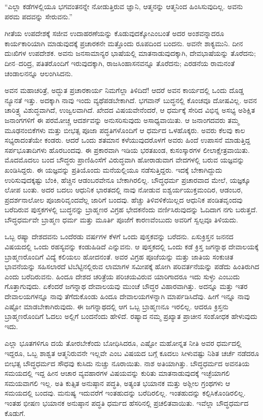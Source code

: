 “ಎಲ್ಲಾ ಕಡೆಗಳಲ್ಲಿಯೂ ಭಗವಂತನನ್ನೇ ನೋಡುತ್ತಿರುವ ಜ್ಞಾನಿ, ಆತ್ಮನನ್ನು ಆತ್ಮನಿಂದ ಹಿಂಸಿಸುವುದಿಲ್ಲ. ಅವನು ಪರಮ ಪದವನ್ನು ಸೇರುವನು.”

ಗೀತೆಯ ಉಪದೇಶಕ್ಕೆ ಸಜೀವ ಉದಾಹರಣೆಯನ್ನು ಕೊಡುವುದಕ್ಕೋ\break ಎಂಬಂತೆ ಅದರ ಅಂಶವನ್ನಾದರೂ ಕಾರ್ಯಕಾರಿಯಾಗಿ ಮಾಡುವುದಕ್ಕೆ ಪ್ರಚಾರಕನೇ ಮತ್ತೊಂದು ರೂಪದಿಂದ ಬಂದನು. ಅವನೇ ಶಾಕ್ಯಮುನಿ. ದೀನ ದುಃಖಿಗಳ ಉಪದೇಶಕ. ಅವನು ಜನಸಾಮಾನ್ಯರ ಭಾಷೆಯಲ್ಲಿ ಮಾತನಾಡುವುದಕ್ಕಾಗಿ, ದೇವಭಾಷೆಯನ್ನು ತೊರೆದನು; ದೀನ–ದರಿದ್ರ, ಪತಿತರೊಂದಿಗೆ ಇರುವುದಕ್ಕಾಗಿ, ರಾಜಸಿಂಹಾಸನವನ್ನೂ ತೊರೆದನು; ಎರಡನೆಯ ರಾಮನಂತೆ ಚಂಡಾಲನನ್ನೂ ಆಲಂಗಿಸಿದನು. 

ಅವನ ಮಹಾಚರಿತ್ರೆ, ಅದ್ಭುತ ಪ್ರಚಾರಕಾರ್ಯ ನಿಮಗೆಲ್ಲಾ ತಿಳಿದಿದೆ! ಆದರೆ ಅವನ ಕಾರ್ಯದಲ್ಲಿ ಒಂದು ದೊಡ್ಡ ನ್ಯೂನತೆ ಇತ್ತು. ಅದಕ್ಕಾಗಿ ನಾವು ಇಂದು ವ್ಯಥೆಪಡಬೇಕಾಗಿದೆ. ಭಗವಾನ್​ ಬುದ್ಧನಲ್ಲಿ ಕೊಂಚವೂ ದೋಷವಿಲ್ಲ. ಅವನ ಚಾರಿತ್ರ್ಯ ವಿಶುದ್ಧವಾಗಿದೆ, ಉಜ್ವಲವಾಗಿದೆ. ಖೇದದ ವಿಷಯವೇನೆಂದರೆ, ಆ ಧರ್ಮಕ್ಕೆ ಸೇರಿದ ವಿಭಿನ್ನ ಅಸಭ್ಯ ಅಶಿಕ್ಷಿತ ಜನಾಂಗಗಳಿಗೆ ಈ ಪರಮೋಚ್ಚ ಆದರ್ಶವನ್ನು ಅನುಸರಿಸುವುದು ಅಸಾಧ್ಯವಾಯಿತು. ಆ ಜನಾಂಗದವರು ತಮ್ಮ ಮೂಢನಂಬಿಕೆಗಳು ಮತ್ತು ಬೀಭತ್ಸ ಪೂಜಾ ಪದ್ಧತಿಗಳೊಂದಿಗೆ ಆ ಧರ್ಮದ ಒಳಹೊಕ್ಕರು. ಅವರು ಕೆಲವು ಕಾಲ ಸಭ್ಯರಾದಂತೆಯೇ ಕಂಡರು. ಆದರೆ ಒಂದು ಶತಮಾನ ಕಳೆಯುವುದರೊಳಗೆ ಅವರು ಹಿಂದೆ ಉಪಾಸನೆ ಮಾಡುತ್ತಿದ್ದ ಸರ್ಪಭೂತಾದಿಗಳು ಹೊರಬಂದವು. ಈ ಪ್ರಕಾರವಾಗಿ ಇಡಿಯ ಭರತಖಂಡ, ಕುಸಂಸ್ಕಾರಗಳ ಲೀಲಾಕ್ಷೇತ್ರವಾಯಿತು. ಮೊದಮೊದಲು ಬಂದ ಬೌದ್ಧರು ಪ್ರಾಣಿಹಿಂಸೆಗೆ ವಿರುದ್ಧವಾಗಿ ಹೋರಾಡುವಾಗ ವೇದಗಳಲ್ಲಿ ಬರುವ ಯಜ್ಞವನ್ನು ಖಂಡಿಸಿದ್ದರು. ಈ ಯಜ್ಞವನ್ನು ಪ್ರತಿಯೊಂದು ಮನೆಯಲ್ಲಿಯೂ ನಡೆಸುತ್ತಿದ್ದರು. ಇದಕ್ಕೆ ಬೇಕಾಗಿದ್ದುದು ಉರಿಸುವುದಕ್ಕಷ್ಟು ಬೆಂಕಿ, ಹೆಚ್ಚಿನ ಆಡಂಬರವೇನೂ ಬೇಕಾಗಿರಲಿಲ್ಲ. ಬೌದ್ಧಧರ್ಮ ಪ್ರಚಾರವಾದ ಮೇಲೆ, ಯಜ್ಞಕ್ಕೂ ಲೋಪ ಬಂತು. ಅದರ ಬದಲು ಆಧುನಿಕ ಭಾರತದಲ್ಲಿ ನಾವು ನೋಡುವ ಐಶ್ವರ್ಯಯುಕ್ತಮಂದಿರ, ಆಡಂಬರ, ಪ್ರದರ್ಶನಾಲೋಲ ಪೂಜಾರಿವೃಂದವೆಲ್ಲ ಜಾರಿಗೆ ಬಂದವು. ಹೆಚ್ಚು ತಿಳಿವಳಿಕೆಯಿಲ್ಲದ ಆಧುನಿಕ ಪಂಡಿತವೃಂದವು ಬರೆದಿರುವ ಪುಸ್ತಕಗಳಲ್ಲಿ ಬುದ್ಧನನ್ನು ಬ್ರಾಹ್ಮಣರ ವಿಗ್ರಹ ಭೇದಕನೆಂದು ವರ್ಣಿಸಿರುವುದನ್ನು ಓದಿದಾಗ ನಗು ಬರುತ್ತದೆ. ಬೌದ್ಧಧರ್ಮವೇ ಬ್ರಾಹ್ಮಣ ಧರ್ಮ ಮತ್ತು ಮೂರ್ತಿ ಪೂಜೆಗೆ ಕಾರಣವೆಂಬುದು ಅವರಿಗೆ ಸ್ವಲ್ಪವೂ ತಿಳಿಯದು. 

ಒಬ್ಬ ರಷ್ಯಾ ದೇಶದವನು ಒಂದೆರಡು ವರ್ಷಗಳ ಕೆಳಗೆ ಒಂದು ಪುಸ್ತಕವನ್ನು ಬರೆದನು. ಏಸುಕ್ರಿಸ್ತನ ಜನನದ ವಿಷಯದಲ್ಲಿ ಒಂದು ರಹಸ್ಯವನ್ನು ಕಂಡುಹಿಡಿದೆ ಎನ್ನುವನು. ಆ ಪುಸ್ತಕದಲ್ಲಿ ಒಂದು ಕಡೆ ಕ್ರಿಸ್ತ ಜಗನ್ನಾಥ ದೇವಾಲಯಕ್ಕೆ ಬ್ರಾಹ್ಮಣರೊಂದಿಗೆ ವಿದ್ಯೆ ಕಲಿಯಲು ಹೋದನಂತೆ. ಅವರ ವಿಗ್ರಹ ಪೂಜೆಯನ್ನು ಮತ್ತು ಜಾತಿಯ ಸಂಕುಚಿತ ಭಾವನೆಯನ್ನು ಸಹಿಸಲಾರದೆ ಟಿಬೆಟ್ಟಿನಲ್ಲಿರುವ ಲಾಮಾಗಳ ಸಮೀಪಕ್ಕೆ ಹೋಗಿ ಪರಿವರ್ತನೆಯನ್ನು ಪಡೆದು ಹಿಂತಿರುಗಿದ ಎಂದು ಬರೆದಿರುವನು. ಹಿಂದೂ ದೇಶದ ಚರಿತ್ರೆಯ ಪರಿಚಯವಿರುವ ಯಾರಿಗಾದರೂ ಇದು ಸುಳ್ಳು ಎಂಬುದು ಗೊತ್ತಾಗುವುದು. ಏಕೆಂದರೆ ಜಗನ್ನಾಥ ದೇವಾಲಯವು ಮುಂಚೆ ಬೌದ್ಧರ ವಿಹಾರವಾಗಿತ್ತು. ಅದನ್ನೂ ಮತ್ತು ಇತರ ದೇವಾಲಯಗಳನ್ನೂ ನಾವು ತೆಗೆದುಕೊಂಡು ಹಿಂದೂ ದೇವಾಲಯಗಳನ್ನಾಗಿ ಮಾರ್ಪಡಿಸಿದೆವು. ಹೀಗೆ ಇನ್ನೂ ನಾವು ಎಷ್ಟೋ ಮಾಡಬೇಕಾಗಿರುವುದು. ಈ ಜಗನ್ನಾಥದಲ್ಲಿ ಆಗ ಒಬ್ಬ ಬ್ರಾಹ್ಮಣನೂ ಇರಲಿಲ್ಲ. ಆದರೂ ಕ್ರಿಸ್ತನು ಬ್ರಾಹ್ಮಣರೊಂದಿಗೆ ಓದಲು ಅಲ್ಲಿಗೆ ಬಂದನೆಂದು ಹೇಳಿದೆ. ರಷ್ಯಾದ ನಮ್ಮ ಪ್ರಖ್ಯಾತ ಪ್ರಾಚೀನ ಸಂಶೋಧಕ ಹೇಳುವುದು ಇದು. 

ಎಲ್ಲಾ ಭೂತಗಳಿಗೂ ದಯೆ ತೋರಬೇಕೆಂದು ಬೋಧಿಸಿದರೂ, ಎಷ್ಟೋ ಮಹೋನ್ನತ ನೀತಿ ಅವರ ಧರ್ಮದಲ್ಲಿ ಇದ್ದರೂ, ಒಬ್ಬ ಶಾಶ್ವತ ಆತ್ಮನಿರುವನೇ ಇಲ್ಲವೇ ಎಂಬ ವಿಷಯದ ಬಗ್ಗೆ ಕೂದಲು ಸೀಳುವಷ್ಟು ನಿಶಿತ ಚರ್ಚೆ ನಡೆದರೂ ಬೀಭತ್ಸ ಬೌದ್ಧಧರ್ಮದ ಸೌಧವು ಕುಸಿದು ನುಚ್ಚು ನೂರಾಯಿತು. ನಾಶ ಅತಿಯಾಗಿತ್ತು. ಬೌದ್ಧಧರ್ಮದ ಅವನತಿಯ ಸಮಯದಲ್ಲಿ ಇದ್ದ ಹೀನ ಆಚಾರ ವ್ಯವಹಾರಗಳ ವಿಷಯವನ್ನು ಕುರಿತು ಮಾತನಾಡುವುದಕ್ಕೆ ಇಚ್ಛೆಯಾಗಲಿ ಸಮಯವಾಗಲಿ ಇಲ್ಲ. ಅತಿ ಕುತ್ಸಿತ ಅನುಷ್ಠಾನ ಪದ್ಧತಿ, ಅತ್ಯಂತ ಭಯಾನಕ ಮತ್ತು ಅಶ್ಲೀಲ ಗ್ರಂಥಗಳು ಆ ಸಮಯದಲ್ಲಿ ಬಂದವು. ಮನುಷ್ಯ ಇದುವರೆಗೆ ಇಂತಹುದನ್ನು ಬರೆದಿರಲಿಲ್ಲ. ಇಂತಹುದನ್ನು ಕಲ್ಪಿಸಿಕೊಂಡಿರಲಿಲ್ಲ. ಇಂತಹ ಭೀಷಣ ಭಯಾನಕ ಅನುಷ್ಠಾನ ಪದ್ಧತಿ ಧರ್ಮದ ಹೆಸರಿನಲ್ಲಿ ಪ್ರಚಲಿತವಾಯಿತು. ಇವೆಲ್ಲಾ ಬೌದ್ಧಧರ್ಮದ ಕೊಡುಗೆ. 

